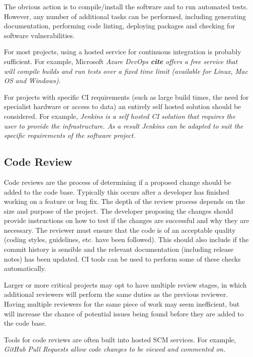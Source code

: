 \documentclass[jnr]{iosart2x}
\newcommand{\todo}[1]{\textbf{#1}}
\begin{document}
The obvious action is to compile/install the software and to run automated tests.
However, any number of additional tasks can be performed, including generating documentation, performing code linting, deploying packages and checking for software vulnerabilities.

For most projects, using a hosted service for continuous integration is probably sufficient.
For example, Microsoft \it{Azure DevOps} \todo{cite} offers a free service that will compile builds and run tests over a fixed time limit (available for \it Linux, \it{Mac OS} and \it Windows).

For projects with specific CI requirements (such as large build times, the need for specialist hardware or access to data) an entirely self hosted solution should be considered.
For example, \it Jenkins \cite{Jenkins} is a self hosted CI solution that requires the user to provide the infrastructure.
As a result \it Jenkins can be adapted to suit the specific requirements of the software project.

\subsection{Code Review}
\label{Code review}

Code reviews are the process of determining if a proposed change should be added to the code base.
Typically this occurs after a developer has finished working on a feature or bug fix.
The depth of the review process depends on the size and purpose of the project.
The developer proposing the changes should provide instructions on how to test if the changes are successful and why they are necessary.
The reviewer must ensure that the code is of an acceptable quality (coding styles, guidelines, etc. have been followed).
This should also include if the commit history is sensible and the relevant documentation (including release notes) has been updated.
CI tools can be used to perform some of these checks automatically.

Larger or more critical projects may opt to have multiple review stages, in which additional reviewers will perform the same duties as the previous reviewer.
Having multiple reviewers for the same piece of work may seem inefficient, but will increase the chance of potential issues being found before they are added to the code base.

Tools for code reviews are often built into hosted SCM services.
For example, \it GitHub Pull Requests allow code changes to be viewed and commented on.
\end{document}
